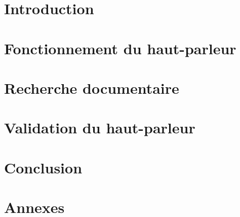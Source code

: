 \documentclass{report}
\begin{document}





\clearpage
\tableofcontents
\clearpage

\chapter{Introduction}



\chapter{Fonctionnement du haut-parleur}


\clearpage


\clearpage


\clearpage


\clearpage



\chapter{Recherche documentaire}


\clearpage



\chapter{Validation du haut-parleur}



\chapter{Conclusion}


\clearpage



\nocite{*}

\chapter{Annexes}


\clearpage


\clearpage


\clearpage


\clearpage


\end{document}
